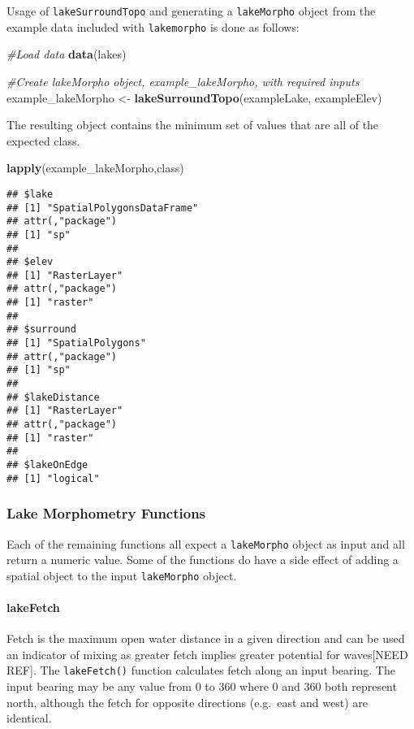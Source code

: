 \documentclass[11pt,]{article}
\newenvironment{Shaded}{\begin{snugshade}}{\end{snugshade}}
\newcommand{\KeywordTok}[1]{\textcolor[rgb]{0.13,0.29,0.53}{\textbf{{#1}}}}
\newcommand{\StringTok}[1]{\textcolor[rgb]{0.31,0.60,0.02}{{#1}}}
\newcommand{\CommentTok}[1]{\textcolor[rgb]{0.56,0.35,0.01}{\textit{{#1}}}}
\newcommand{\NormalTok}[1]{{#1}}
\begin{document}
Usage of \texttt{lakeSurroundTopo} and generating a \texttt{lakeMorpho}
object from the example data included with \texttt{lakemorpho} is done
as follows:

\begin{Shaded}
\begin{Highlighting}[]
\CommentTok{#Load data}
\KeywordTok{data}\NormalTok{(lakes)}

\CommentTok{#Create lakeMorpho object, example_lakeMorpho, with required inputs}
\NormalTok{example_lakeMorpho <-}\StringTok{ }\KeywordTok{lakeSurroundTopo}\NormalTok{(exampleLake, exampleElev)}
\end{Highlighting}
\end{Shaded}

The resulting object contains the minimum set of values that are all of
the expected class.

\begin{Shaded}
\begin{Highlighting}[]
\KeywordTok{lapply}\NormalTok{(example_lakeMorpho,class)}
\end{Highlighting}
\end{Shaded}

\begin{verbatim}
## $lake
## [1] "SpatialPolygonsDataFrame"
## attr(,"package")
## [1] "sp"
## 
## $elev
## [1] "RasterLayer"
## attr(,"package")
## [1] "raster"
## 
## $surround
## [1] "SpatialPolygons"
## attr(,"package")
## [1] "sp"
## 
## $lakeDistance
## [1] "RasterLayer"
## attr(,"package")
## [1] "raster"
## 
## $lakeOnEdge
## [1] "logical"
\end{verbatim}

\subsubsection{Lake Morphometry
Functions}\label{lake-morphometry-functions}

Each of the remaining functions all expect a \texttt{lakeMorpho} object
as input and all return a numeric value. Some of the functions do have a
side effect of adding a spatial object to the input \texttt{lakeMorpho}
object.

\paragraph{lakeFetch}\label{lakefetch}

Fetch is the maximum open water distance in a given direction and can be
used an indicator of mixing as greater fetch implies greater potential
for waves{[}NEED REF{]}. The \texttt{lakeFetch()} function calculates
fetch along an input bearing. The input bearing may be any value from 0
to 360 where 0 and 360 both represent north, although the fetch for
opposite directions (e.g.~east and west) are identical.
\end{document}
